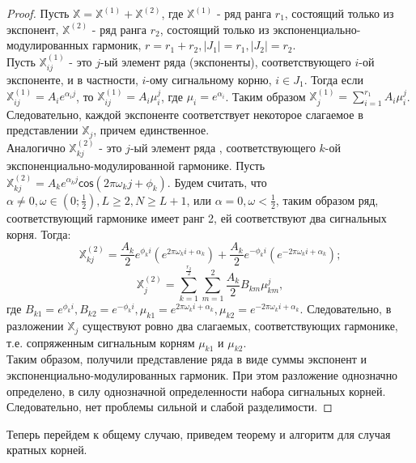 \documentclass[specialist,
               substylefile = spbu_report.rtx,
               subf,href,colorlinks=true, 12pt]{disser}
\theoremstyle{definition}
\begin{document}
\begin{proof}
Пусть $\mathbb{X} = \mathbb{X}^{(1)} + \mathbb{X}^{(2)}$, где $\mathbb{X}^{(1)}$ - ряд ранга $r_1$, состоящий только из экспонент, $\mathbb{X}^{(2)}$ - ряд ранга $r_2$, состоящий только из экспоненциально-модулированных гармоник, $r = r_1 + r_2, |J_1| = r_1, |J_2| = r_2$. \\
\hspace*{0.5cm}Пусть $\mathbb{X}^{(1)}_{ij}$ - это $j$-ый элемент ряда (экспоненты), соответствующего $i$-ой экспоненте, и в частности, $i$-ому сигнальному корню, $i \in J_1$. Тогда если $\mathbb{X}^{(1)}_{ij} = A_i e^{\alpha_i j}$, то $\mathbb{X}^{(1)}_{ij} = A_i\mu_i^j$, где $\mu_i = e^{\alpha_i}$. Таким образом $\mathbb{X}^{(1)}_j = \sum_{i = 1}^{r_1}A_i\mu_i^j$. Следовательно, каждой экспоненте соответствует некоторое слагаемое в представлении $\mathbb{X}_j$, причем единственное. \\
\hspace*{0.5cm} Аналогично $\mathbb{X}^{(2)}_{kj}$ - это $j$-ый элемент ряда , соответствующего $k$-ой экспоненциально-модулированной гармонике. Пусть $\mathbb{X}^{(2)}_{kj} = A_k e^{\alpha_k j}\mathsf{cos}(2\pi \omega_k j + \phi_k)$. Будем считать, что $\alpha \neq 0,\omega \in (0;\frac{1}{2}), L \geq 2, N \geq L + 1$, или $\alpha = 0, \omega < \frac{1}{2}$, таким образом ряд, соответствующий гармонике имеет ранг 2, ей соответствуют два сигнальных корня. Тогда:
\begin{equation*}
    \mathbb{X}^{(2)}_{kj} = \frac{A_k}{2}e^{\phi_k i}(e^{2\pi \omega_k i + \alpha_k}) + \frac{A_k}{2}e^{-\phi_k i}(e^{-2\pi \omega_k i + \alpha_k});
\end{equation*}
\begin{equation*}
    \mathbb{X}^{(2)}_{j} = \sum_{k = 1}^{\frac{r_2}{2}}\sum_{m = 1}^{2}\frac{A_k}{2}B_{km}\mu_{km}^{j},
\end{equation*}
где $B_{k1} = e^{\phi_k i}, B_{k2} = e^{-\phi_k i}, \mu_{k1} = e^{2\pi \omega_k i + \alpha_k}, \mu_{k2} = e^{-2\pi \omega_k i + \alpha_k}$. Следовательно, в разложении $\mathbb{X}_j$ существуют ровно два слагаемых, соответствующих гармонике, т.е. сопряженным сигнальным корням $\mu_{k1}$ и $\mu_{k2}$. \\
Таким образом, получили представление ряда в виде суммы экспонент и экспоненциально-модулированных гармоник. При этом разложение однозначно определено, в силу однозначной определенности набора сигнальных корней. Следовательно, нет проблемы сильной и слабой разделимости.
\end{proof}

Теперь перейдем к общему случаю, приведем теорему и алгоритм для случая кратных корней.
\end{document}
